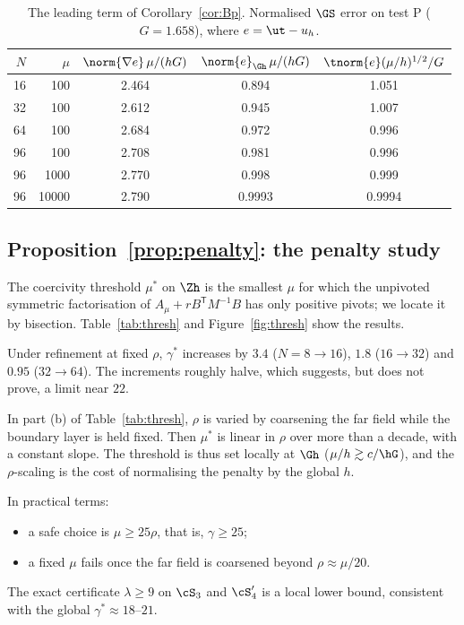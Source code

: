 \begin{table}[t]
\centering
\caption{The leading term of Corollary~\ref{cor:Bp}. Normalised $\GS$ error on test P ($G=1.658$), where $e=\ut-u_h$.}\label{tab:P}
\begin{tabular}{rrccc}
\toprule
$N$ & $\mu$ & $\norm{\nabla e}\,\mu/(hG)$ & $\norm{e}_{\Gh}\,\mu/(hG)$ & $\tnorm{e}(\mu/h)^{1/2}/G$\\
\midrule
16 & 100 & 2.464 & 0.894 & 1.051\\
32 & 100 & 2.612 & 0.945 & 1.007\\
64 & 100 & 2.684 & 0.972 & 0.996\\
96 & 100 & 2.708 & 0.981 & 0.996\\
96 & 1000 & 2.770 & 0.998 & 0.999\\
96 & 10000 & 2.790 & 0.9993 & 0.9994\\
\bottomrule
\end{tabular}
\end{table}

\subsection*{Proposition~\ref{prop:penalty}: the penalty study}
The coercivity threshold $\mu^\ast$ on $\Zh$ is the smallest $\mu$ for which the unpivoted symmetric factorisation of $A_\mu+rB^{\mathsf T}M^{-1}B$ has only positive pivots; we locate it by bisection. Table~\ref{tab:thresh} and Figure~\ref{fig:thresh} show the results.

Under refinement at fixed $\rho$, $\gamma^\ast$ increases by $3.4$ ($N=8\to16$), $1.8$ ($16\to32$) and $0.95$ ($32\to64$). The increments roughly halve, which suggests, but does not prove, a limit near $22$.

In part (b) of Table~\ref{tab:thresh}, $\rho$ is varied by coarsening the far field while the boundary layer is held fixed. Then $\mu^\ast$ is linear in $\rho$ over more than a decade, with a constant slope. The threshold is thus set locally at $\Gh$ ($\mu/h\gtrsim c/\hG$), and the $\rho$-scaling is the cost of normalising the penalty by the global $h$.

In practical terms:
\begin{itemize}
\item a safe choice is $\mu\ge25\rho$, that is, $\gamma\ge25$;
\item a fixed $\mu$ fails once the far field is coarsened beyond $\rho\approx\mu/20$.
\end{itemize}
The exact certificate $\lambda\ge9$ on $\cS_3$ and $\cS_4'$ is a local lower bound, consistent with the global $\gamma^\ast\approx18$--$21$.

